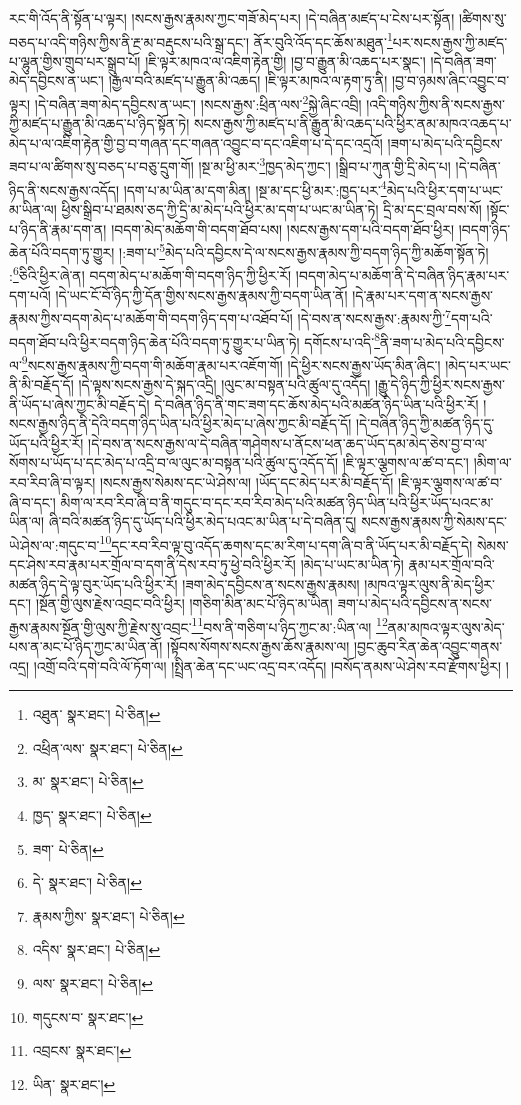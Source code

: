 རང་གི་འོད་ནི་སྟོན་པ་ལྟར། །སངས་རྒྱས་རྣམས་ཀྱང་གཟོ་མེད་པར། །དེ་བཞིན་མཛད་པ་ངེས་པར་སྟོན། །ཚིགས་སུ་བཅད་པ་འདི་གཉིས་ཀྱིས་ནི་རྔ་མ་བརྡུངས་པའི་སྒྲ་དང་། ནོར་བུའི་འོད་དང་ཆོས་མཐུན་\footnote{འཐུན་  སྣར་ཐང་།  པེ་ཅིན། }པར་སངས་རྒྱས་ཀྱི་མཛད་པ་ལྷུན་གྱིས་གྲུབ་པར་སྒྲུབ་པོ། །ཇི་ལྟར་མཁའ་ལ་འཇིག་རྟེན་གྱི། །བྱ་བ་རྒྱུན་མི་འཆད་པར་སྣང་། །དེ་བཞིན་ཟག་མེད་དབྱིངས་ན་ཡང་། །རྒྱལ་བའི་མཛད་པ་རྒྱུན་མི་འཆད། །ཇི་ལྟར་མཁའ་ལ་རྟག་ཏུ་ནི། །བྱ་བ་ཉམས་ཞིང་འབྱུང་བ་ལྟར། །དེ་བཞིན་ཟག་མེད་དབྱིངས་ན་ཡང་། །སངས་རྒྱས་:ཕྲིན་ལས་\footnote{འཕྲིན་ལས་  སྣར་ཐང་།  པེ་ཅིན། }སྐྱེ་ཞིང་འབྲི། །འདི་གཉིས་ཀྱིས་ནི་སངས་རྒྱས་ཀྱི་མཛད་པ་རྒྱུན་མི་འཆད་པ་ཉིད་སྟོན་ཏེ། སངས་རྒྱས་ཀྱི་མཛད་པ་ནི་རྒྱུན་མི་འཆད་པའི་ཕྱིར་ནམ་མཁའ་འཆད་པ་མེད་པ་ལ་འཇིག་རྟེན་གྱི་བྱ་བ་གཞན་དང་གཞན་འབྱུང་བ་དང་འཇིག་པ་དེ་དང་འདྲའོ། །ཟག་པ་མེད་པའི་དབྱིངས་ཟབ་པ་ལ་ཚིགས་སུ་བཅད་པ་བཅུ་དྲུག་གོ། །སྔ་མ་ཕྱི་མར་\footnote{མ་  སྣར་ཐང་།  པེ་ཅིན། }ཁྱད་མེད་ཀྱང་། །སྒྲིབ་པ་ཀུན་གྱི་དྲི་མེད་པ། །དེ་བཞིན་ཉིད་ནི་སངས་རྒྱས་འདོད། །དག་པ་མ་ཡིན་མ་དག་མིན། །སྔ་མ་དང་ཕྱི་མར་:ཁྱད་པར་\footnote{ཁྱད་  སྣར་ཐང་།  པེ་ཅིན། }མེད་པའི་ཕྱིར་དག་པ་ཡང་མ་ཡིན་ལ། ཕྱིས་སྒྲིབ་པ་ཐམས་ཅད་ཀྱི་དྲི་མ་མེད་པའི་ཕྱིར་མ་དག་པ་ཡང་མ་ཡིན་ཏེ། དྲི་མ་དང་བྲལ་བས་སོ། །སྟོང་པ་ཉིད་ནི་རྣམ་དག་ན། །བདག་མེད་མཆོག་གི་བདག་ཐོབ་པས། །སངས་རྒྱས་དག་པའི་བདག་ཐོབ་ཕྱིར། །བདག་ཉིད་ཆེན་པོའི་བདག་ཏུ་གྱུར། །:ཟག་པ་\footnote{ཟག་  པེ་ཅིན། }མེད་པའི་དབྱིངས་དེ་ལ་སངས་རྒྱས་རྣམས་ཀྱི་བདག་ཉིད་ཀྱི་མཆོག་སྟོན་ཏེ། :\footnote{དེ་  སྣར་ཐང་།  པེ་ཅིན། }ཅིའི་ཕྱིར་ཞེ་ན། བདག་མེད་པ་མཆོག་གི་བདག་ཉིད་ཀྱི་ཕྱིར་རོ། །བདག་མེད་པ་མཆོག་ནི་དེ་བཞིན་ཉིད་རྣམ་པར་དག་པའོ། །དེ་ཡང་ངོ་བོ་ཉིད་ཀྱི་དོན་གྱིས་སངས་རྒྱས་རྣམས་ཀྱི་བདག་ཡིན་ནོ། །དེ་རྣམ་པར་དག་ན་སངས་རྒྱས་རྣམས་ཀྱིས་བདག་མེད་པ་མཆོག་གི་བདག་ཉིད་དག་པ་འཐོབ་པོ། །དེ་བས་ན་སངས་རྒྱས་:རྣམས་ཀྱི་\footnote{རྣམས་ཀྱིས་  སྣར་ཐང་།  པེ་ཅིན། }དག་པའི་བདག་ཐོབ་པའི་ཕྱིར་བདག་ཉིད་ཆེན་པོའི་བདག་ཏུ་གྱུར་པ་ཡིན་ཏེ། དགོངས་པ་འདི་\footnote{འདིས་  སྣར་ཐང་།  པེ་ཅིན། }ནི་ཟག་པ་མེད་པའི་དབྱིངས་ལ་\footnote{ལས་  སྣར་ཐང་།  པེ་ཅིན། }སངས་རྒྱས་རྣམས་ཀྱི་བདག་གི་མཆོག་རྣམ་པར་འཇོག་གོ། །དེ་ཕྱིར་སངས་རྒྱས་ཡོད་མིན་ཞིང་། །མེད་པར་ཡང་ནི་མི་བརྗོད་དོ། །དེ་ལྟས་སངས་རྒྱས་དེ་སྐད་འདྲི། །ལུང་མ་བསྟན་པའི་ཚུལ་དུ་འདོད། །རྒྱུ་དེ་ཉིད་ཀྱི་ཕྱིར་སངས་རྒྱས་ནི་ཡོད་པ་ཞེས་ཀྱང་མི་བརྗོད་དེ། དེ་བཞིན་ཉིད་ནི་གང་ཟག་དང་ཆོས་མེད་པའི་མཚན་ཉིད་ཡིན་པའི་ཕྱིར་རོ། །སངས་རྒྱས་ཉིད་ནི་དེའི་བདག་ཉིད་ཡིན་པའི་ཕྱིར་མེད་པ་ཞེས་ཀྱང་མི་བརྗོད་དོ། །དེ་བཞིན་ཉིད་ཀྱི་མཚན་ཉིད་དུ་ཡོད་པའི་ཕྱིར་རོ། །དེ་བས་ན་སངས་རྒྱས་ལ་དེ་བཞིན་གཤེགས་པ་ནོངས་ཕན་ཆད་ཡོད་དམ་མེད་ཅེས་བྱ་བ་ལ་སོགས་པ་ཡོད་པ་དང་མེད་པ་འདྲི་བ་ལ་ལུང་མ་བསྟན་པའི་ཚུལ་དུ་འདོད་དོ། །ཇི་ལྟར་ལྕགས་ལ་ཚ་བ་དང་། །མིག་ལ་རབ་རིབ་ཞི་བ་ལྟར། །སངས་རྒྱས་སེམས་དང་ཡེ་ཤེས་ལ། །ཡོད་དང་མེད་པར་མི་བརྗོད་དོ། །ཇི་ལྟར་ལྕགས་ལ་ཚ་བ་ཞི་བ་དང་། མིག་ལ་རབ་རིབ་ཞི་བ་ནི་གདུང་བ་དང་རབ་རིབ་མེད་པའི་མཚན་ཉིད་ཡིན་པའི་ཕྱིར་ཡོད་པའང་མ་ཡིན་ལ། ཞི་བའི་མཚན་ཉིད་དུ་ཡོད་པའི་ཕྱིར་མེད་པའང་མ་ཡིན་པ་དེ་བཞིན་དུ། སངས་རྒྱས་རྣམས་ཀྱི་སེམས་དང་ཡེ་ཤེས་ལ་:གདུང་བ་\footnote{གདུངས་བ་  སྣར་ཐང་། }དང་རབ་རིབ་ལྟ་བུ་འདོད་ཆགས་དང་མ་རིག་པ་དག་ཞི་བ་ནི་ཡོད་པར་མི་བརྗོད་དེ། སེམས་དང་ཤེས་རབ་རྣམ་པར་གྲོལ་བ་དག་ནི་དེས་རབ་ཏུ་ཕྱེ་བའི་ཕྱིར་རོ། །མེད་པ་ཡང་མ་ཡིན་ཏེ། རྣམ་པར་གྲོལ་བའི་མཚན་ཉིད་དེ་ལྟ་བུར་ཡོད་པའི་ཕྱིར་རོ། །ཟག་མེད་དབྱིངས་ན་སངས་རྒྱས་རྣམས། །མཁའ་ལྟར་ལུས་ནི་མེད་ཕྱིར་དང་། །སྔོན་གྱི་ལུས་རྗེས་འབྲང་བའི་ཕྱིར། །གཅིག་མིན་མང་པོ་ཉིད་མ་ཡིན། ཟག་པ་མེད་པའི་དབྱིངས་ན་སངས་རྒྱས་རྣམས་སྔོན་གྱི་ལུས་ཀྱི་རྗེས་སུ་འབྲང་\footnote{འབྲངས་  སྣར་ཐང་། }བས་ནི་གཅིག་པ་ཉིད་ཀྱང་མ་:ཡིན་ལ། \footnote{ཡིན་  སྣར་ཐང་། }ནམ་མཁའ་ལྟར་ལུས་མེད་པས་ན་མང་པོ་ཉིད་ཀྱང་མ་ཡིན་ནོ། །སྟོབས་སོགས་སངས་རྒྱས་ཆོས་རྣམས་ལ། །བྱང་ཆུབ་རིན་ཆེན་འབྱུང་གནས་འདྲ། །འགྲོ་བའི་དགེ་བའི་ལོ་ཏོག་ལ། །སྤྲིན་ཆེན་དང་ཡང་འདྲ་བར་འདོད། །བསོད་ནམས་ཡེ་ཤེས་རབ་རྫོགས་ཕྱིར། །
